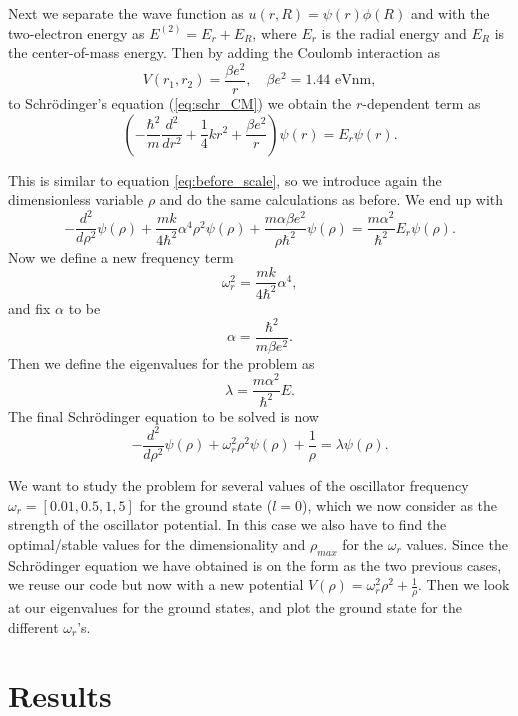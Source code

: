 \documentclass[12pt,a4paper,english]{article}
\begin{document}
Next we separate the wave function as $u(r,R)=\psi(r)\phi(R)$ and with the two-electron energy as $E^{(2)}=E_r+E_R$, where $E_r$ is the radial energy and $E_R$ is the center-of-mass energy. Then by adding the Coulomb interaction as 
\[V(r_1,r_2)=\frac{\beta e^2}{r},\quad \beta e^2=1.44 \text{ eVnm},\]
to Schrödinger's equation (\ref{eq:schr_CM}) we obtain the $r$-dependent term as
\begin{equation}
\label{eq:shcr_split_2}
\left(-\frac{\hbar^2}{m}\frac{d^2}{dr^2}+\frac{1}{4}kr^2+\frac{\beta e^2}{r}\right)\psi(r)=E_r\psi(r).
\end{equation}

This is similar to equation \ref{eq:before_scale}, so we introduce again the dimensionless variable $\rho$ and do the same calculations as before. We end up with 
\begin{equation}
\label{eq:before_alpha_2}
-\frac{d^2}{d\rho^2}\psi(\rho)+\frac{mk}{4\hbar^2}\alpha^4\rho^2\psi(\rho)+\frac{m\alpha\beta e^2}{\rho\hbar^2}\psi(\rho)=\frac{m\alpha^2}{\hbar^2}E_r\psi(\rho).
\end{equation}
Now we define a new frequency term
\[\omega_r^2=\frac{mk}{4\hbar^2}\alpha^4,\]
and fix $\alpha$ to be
\[\alpha=\frac{\hbar^2}{m\beta e^2}.\]
Then we define the eigenvalues for the problem as 
\begin{equation}
\label{eq:eigenval_2}
\lambda=\frac{m\alpha^2}{\hbar^2}E.
\end{equation}
The final Schrödinger equation to be solved is now
\begin{equation}
\label{eq:final_schr_2}
-\frac{d^2}{d\rho^2}\psi(\rho)+\omega_r^2\rho^2\psi(\rho)+\frac{1}{\rho}=\lambda\psi(\rho).
\end{equation}

We want to study the problem for several values of the oscillator frequency\\ $\omega_r=[0.01, 0.5, 1, 5]$ for the ground state ($l=0$), which we now consider as the strength of the oscillator potential. In this case we also have to find the optimal/stable values for the dimensionality and $\rho_{max}$ for the $\omega_r$ values. Since the Schrödinger equation we have obtained is on the form as the two previous cases, we reuse our code but now with a new potential $V(\rho)=\omega_r^2\rho^2+\frac{1}{\rho}$. Then we look at our eigenvalues for the ground states, and plot the ground state for the different $\omega_r$'s.

\section{Results}
\end{document}
